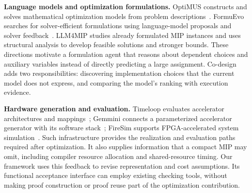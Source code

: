 \textbf{Language models and optimization formulations.}
OptiMUS constructs and solves mathematical optimization models from problem descriptions~\cite{optimus}. FormuEvo searches for solver-efficient formulations using language-model proposals and solver feedback~\cite{formuevo}. LLM4MIP studies already formulated MIP instances and uses structural analysis to develop feasible solutions and stronger bounds. These directions motivate a formulation agent that reasons about dependent choices and auxiliary variables instead of directly predicting a large assignment. Co-design adds two responsibilities: discovering implementation choices that the current model does not express, and comparing the model's ranking with execution evidence.

\textbf{Hardware generation and evaluation.}
Timeloop evaluates accelerator architectures and mappings~\cite{timeloop}; Gemmini connects a parameterized accelerator generator with its software stack~\cite{gemmini}; FireSim supports FPGA-accelerated system simulation~\cite{firesim}. Such infrastructure provides the realization and evaluation paths required after optimization. It also supplies information that a compact MIP may omit, including compiler resource allocation and shared-resource timing. Our framework uses this feedback to revise representation and cost assumptions. Its functional acceptance interface can employ existing checking tools, without making proof construction or proof reuse part of the optimization contribution.
